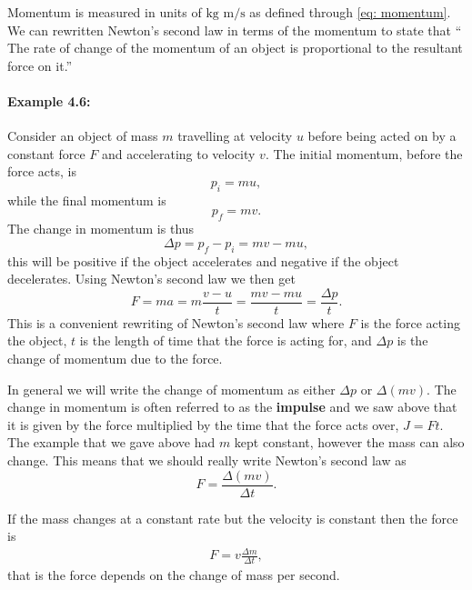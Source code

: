 \documentclass[a4paper,12pt]{book}
\begin{document}
Momentum is measured in units of $\text{kg m/s}$ as defined through \cref{eq: momentum}.  We can rewritten Newton's second law in terms of the momentum to state that `` The rate of change of the momentum of an object is proportional to the resultant force on it.''

\paragraph{Example 4.6:} Consider an object of mass $m$ travelling at velocity $u$ before being acted on by a constant force $F$ and accelerating to velocity $v$. The initial momentum, before the force acts, is
\begin{equation*}
p_{i}=mu,
\end{equation*}
while the final momentum is 
\begin{equation*}
p_{f}=mv.
\end{equation*}
The change in momentum is thus
\begin{equation*}
\Delta p=p_{f}-p_{i}=mv-mu,
\end{equation*}
this will be positive if the object accelerates and negative if the object decelerates. Using Newton's second law we then get
\begin{equation*}
F=ma=m\frac{v-u}{t}=\frac{mv-mu}{t}=\frac{\Delta p}{t}.
\end{equation*}
This is a convenient rewriting of Newton's second law where $F$ is the force acting the object, $t$ is the length of time that the force is acting for, and $\Delta p$ is the change of momentum due to the force.

In general we will write the change of momentum as either $\Delta p$ or $\Delta \left(mv\right)$. The change in momentum is often referred to as the \textbf{impulse} and we saw above that it is given by the force multiplied by the time that the force acts over, $J=F t$. The example that we gave above had $m$ kept constant, however the mass can also change. This means that we should really write Newton's second law as
\begin{equation*}
F=\frac{\Delta\left(mv\right)}{\Delta t}.
\end{equation*}

If the mass changes at a constant rate but the velocity is constant then the force is 
\begin{align*}
F=v\frac{\Delta m}{\Delta t},
\end{align*}
that is the force depends on the change of mass per second.
\end{document}
